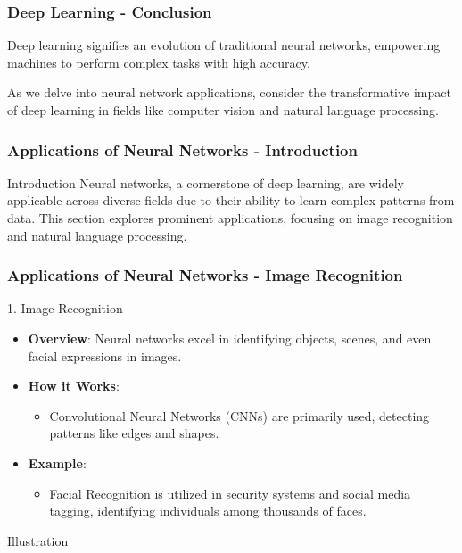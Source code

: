 \documentclass{beamer}
\begin{document}
\begin{frame}[fragile]
    \frametitle{Deep Learning - Conclusion}
    Deep learning signifies an evolution of traditional neural networks, empowering machines to perform complex tasks with high accuracy. 

    As we delve into neural network applications, consider the transformative impact of deep learning in fields like computer vision and natural language processing.
\end{frame}

\begin{frame}[fragile]
    \frametitle{Applications of Neural Networks - Introduction}
    \begin{block}{Introduction}
        Neural networks, a cornerstone of deep learning, are widely applicable across diverse fields due to their ability to learn complex patterns from data. This section explores prominent applications, focusing on image recognition and natural language processing.
    \end{block}
\end{frame}

\begin{frame}[fragile]
    \frametitle{Applications of Neural Networks - Image Recognition}
    \begin{block}{1. Image Recognition}
        \begin{itemize}
            \item \textbf{Overview}: Neural networks excel in identifying objects, scenes, and even facial expressions in images.
            \item \textbf{How it Works}:
            \begin{itemize}
                \item Convolutional Neural Networks (CNNs) are primarily used, detecting patterns like edges and shapes.
            \end{itemize}
            \item \textbf{Example}: 
            \begin{itemize}
                \item Facial Recognition is utilized in security systems and social media tagging, identifying individuals among thousands of faces.
            \end{itemize}
        \end{itemize}
    \end{block}

    \begin{block}{Illustration}
    \end{block}
\end{frame}
\end{document}
